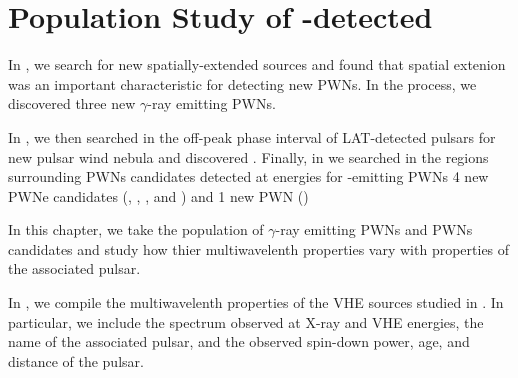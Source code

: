 \chapter{Population Study of -detected }



In , we search for new spatially-extended \fermi
sources and found that spatial extenion was an important characteristic
for detecting new \acp{PWN}. In the process, we discovered three
new $\gamma$-ray emitting \acp{PWN}.  

In , we then
searched in the off-peak phase interval of \ac{LAT}-detected pulsars
for new pulsar wind nebula and discovered \threecfiftyeight.  Finally,
in  we searched in the regions surrounding \acp{PWN}
candidates detected at \tev energies for \gev-emitting \acp{PWN}
4 new PWNe candidates (, , ,
and ) and 1 new PWN ()

In this chapter, we take the population of $\gamma$-ray emitting \acp{PWN}
and \acp{PWN} candidates and study how thier multiwavelenth properties
vary with properties of the associated pulsar.




In , we compile the multiwavelenth
properties of the \ac{VHE} sources studied in . In
particular, we include the spectrum observed at X-ray and \ac{VHE}
energies, the name of the associated pulsar, and the observed spin-down
power, age, and distance of the pulsar.



